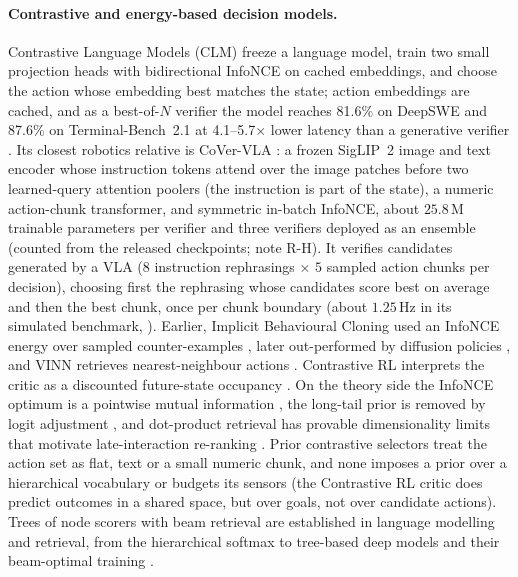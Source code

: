 \paragraph{Contrastive and energy-based decision models.}
Contrastive Language Models (CLM) freeze a language model, train two small projection heads with bidirectional InfoNCE
on cached embeddings, and choose the action whose embedding best matches the state; action embeddings are cached, and as a best-of-$N$ verifier the
model reaches 81.6\% on DeepSWE and 87.6\% on Terminal-Bench~2.1 at 4.1--5.7$\times$ lower latency than a generative verifier
\citep{kwok2026clm}. Its closest robotics relative is CoVer-VLA \citep{kwok2026cover}: a frozen SigLIP~2 image and text encoder whose instruction tokens attend over the image patches before two learned-query attention poolers (the instruction is part of the state), a numeric action-chunk transformer, and symmetric in-batch InfoNCE, about $25.8$\,M trainable parameters per verifier and three verifiers deployed as an ensemble (counted from the released checkpoints; note R-H). It verifies candidates generated by a VLA ($8$ instruction rephrasings $\times$ $5$ sampled action chunks per decision), choosing first the rephrasing whose candidates score best on average and then the best chunk, once per chunk boundary (about $1.25$\,Hz in its simulated benchmark, \evP). Earlier, Implicit Behavioural
Cloning used an InfoNCE energy over sampled counter-examples \citep{florence2021ibc}, later out-performed by diffusion
policies \citep{chi2023diffusionpolicy}, and VINN retrieves nearest-neighbour actions \citep{pari2021vinn}. Contrastive RL
interprets the critic as a discounted future-state occupancy \citep{eysenbach2022contrastiverl,wang2025thousandlayer}.
On the theory side the InfoNCE optimum is a pointwise mutual information \citep{oord2018cpc,poole2019variational},
the long-tail prior is removed by logit adjustment \citep{menon2021logit}, and dot-product retrieval has
provable dimensionality limits \citep{weller2025limits} that motivate late-interaction re-ranking \citep{khattab2020colbert}.
Prior contrastive selectors treat the action set as flat, text or a small numeric chunk, and none imposes a prior over a hierarchical vocabulary or budgets its sensors (the Contrastive RL critic does predict outcomes in a shared space, but over goals, not over candidate actions).
Trees of node scorers with beam retrieval are established in language modelling and retrieval, from the hierarchical softmax \citep{morin2005hierarchical} to tree-based deep models and their beam-optimal training \citep{zhu2018tdm,zhuo2020beam}.

